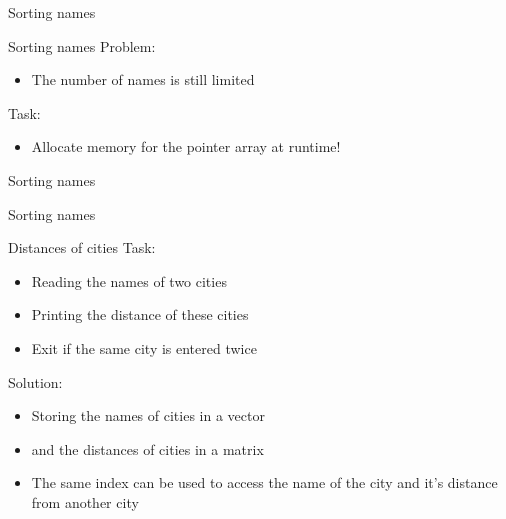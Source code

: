 \documentclass[usenames,dvipsnames,aspectratio=169]{beamer}
\begin{document}
\begin{frame}{Sorting names}
  \footnotesize
  \begin{exampleblock}{}
    \vspace{-.3cm}
    
    
    \vspace{-.3cm}
  \end{exampleblock}
\end{frame}

\begin{frame}{Sorting names}
  Problem:
  \begin{itemize}
    \item[] The number of names is still limited
  \end{itemize}
  Task:
  \begin{itemize}
    \item[] Allocate memory for the pointer array at runtime!
  \end{itemize}
  \footnotesize
  \begin{exampleblock}{}
    
  \end{exampleblock}
\end{frame}

\begin{frame}{Sorting names}
  \footnotesize
  \begin{exampleblock}{}
    
  \end{exampleblock}
\end{frame}

\begin{frame}{Sorting names}
  \footnotesize
  \begin{exampleblock}{}
    
  \end{exampleblock}
\end{frame}

\begin{frame}{Distances of cities}
  Task:
  \begin{itemize}
    \item Reading the names of two cities
    \item Printing the distance of these cities
    \item Exit if the same city is entered twice
  \end{itemize}
  \vfill
  Solution:
  \begin{itemize}
    \item Storing the names of cities in a vector
    \item and the distances of cities in a matrix
    \item The same index can be used to access the name of the city and it's distance from another city
  \end{itemize}
\end{frame}
\end{document}

